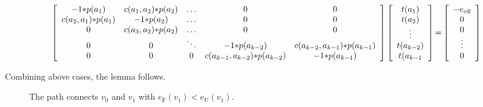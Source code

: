 \documentclass[journal,10pt]{IEEEtran}
\begin{document}
\begin{IEEEproof}
\begin{itemize}
\begin{figure}
\begin{equation}
\label{eqn_violation_proof}
\left[
\begin{array}{c c c c c}
-1{*}p(a_1)          &   c(a_1,a_2){*}p(a_2)  &          \ldots    & 0      &   0\\
c(a_2,a_1){*}p(a_1)  &       -1{*}p(a_2)      &    \ldots    & 0      &    0\\
    0       &   c(a_3,a_2){*}p(a_2)         &    \ldots  & 0      &   0\\
    0       &   0           &         \ddots     &-1{*}p(a_{k{-}2})      &c(a_{k{-}2},a_{k{-}1}){*}p(a_{k{-}1})\\
    0       &   0           &            0    & c(a_{k{-}1},a_{k{-}2}){*}p(a_{k{-}2})     & -1{*}p(a_{k{-}1})\\
\end{array}
\right]
\left[
\begin{array}{c}
t(a_1)\\
t(a_2)\\
\vdots\\
t(a_{k{-}2})\\
t(a_{k{-}1}\\
\end{array}
\right]
{=}
\left[
\begin{array}{c}
-e_{v0}\\
0\\
0\\
\vdots\\
0\\
\end{array}
\right]
\end{equation}
\end{figure}

\end{itemize}

Combining above cases, the lemma follows.
\end{IEEEproof}

\begin{figure}[htb]
\caption{The path connects $v_0$ and $v_1$ with $e_\text{F}(v_1){<}e_\text{U}(v_1)$.}
\label{fig_path}
\end{figure}
\end{document}
